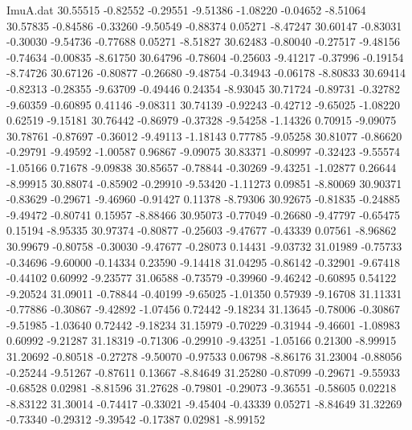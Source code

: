 \begin{filecontents}{ImuA.dat}
  30.55515   -0.82552   -0.29551   -9.51386   -1.08220   -0.04652   -8.51064
  30.57835   -0.84586   -0.33260   -9.50549   -0.88374    0.05271   -8.47247
  30.60147   -0.83031   -0.30030   -9.54736   -0.77688    0.05271   -8.51827
  30.62483   -0.80040   -0.27517   -9.48156   -0.74634   -0.00835   -8.61750
  30.64796   -0.78604   -0.25603   -9.41217   -0.37996   -0.19154   -8.74726
  30.67126   -0.80877   -0.26680   -9.48754   -0.34943   -0.06178   -8.80833
  30.69414   -0.82313   -0.28355   -9.63709   -0.49446    0.24354   -8.93045
  30.71724   -0.89731   -0.32782   -9.60359   -0.60895    0.41146   -9.08311
  30.74139   -0.92243   -0.42712   -9.65025   -1.08220    0.62519   -9.15181
  30.76442   -0.86979   -0.37328   -9.54258   -1.14326    0.70915   -9.09075
  30.78761   -0.87697   -0.36012   -9.49113   -1.18143    0.77785   -9.05258
  30.81077   -0.86620   -0.29791   -9.49592   -1.00587    0.96867   -9.09075
  30.83371   -0.80997   -0.32423   -9.55574   -1.05166    0.71678   -9.09838
  30.85657   -0.78844   -0.30269   -9.43251   -1.02877    0.26644   -8.99915
  30.88074   -0.85902   -0.29910   -9.53420   -1.11273    0.09851   -8.80069
  30.90371   -0.83629   -0.29671   -9.46960   -0.91427    0.11378   -8.79306
  30.92675   -0.81835   -0.24885   -9.49472   -0.80741    0.15957   -8.88466
  30.95073   -0.77049   -0.26680   -9.47797   -0.65475    0.15194   -8.95335
  30.97374   -0.80877   -0.25603   -9.47677   -0.43339    0.07561   -8.96862
  30.99679   -0.80758   -0.30030   -9.47677   -0.28073    0.14431   -9.03732
  31.01989   -0.75733   -0.34696   -9.60000   -0.14334    0.23590   -9.14418
  31.04295   -0.86142   -0.32901   -9.67418   -0.44102    0.60992   -9.23577
  31.06588   -0.73579   -0.39960   -9.46242   -0.60895    0.54122   -9.20524
  31.09011   -0.78844   -0.40199   -9.65025   -1.01350    0.57939   -9.16708
  31.11331   -0.77886   -0.30867   -9.42892   -1.07456    0.72442   -9.18234
  31.13645   -0.78006   -0.30867   -9.51985   -1.03640    0.72442   -9.18234
  31.15979   -0.70229   -0.31944   -9.46601   -1.08983    0.60992   -9.21287
  31.18319   -0.71306   -0.29910   -9.43251   -1.05166    0.21300   -8.99915
  31.20692   -0.80518   -0.27278   -9.50070   -0.97533    0.06798   -8.86176
  31.23004   -0.88056   -0.25244   -9.51267   -0.87611    0.13667   -8.84649
  31.25280   -0.87099   -0.29671   -9.55933   -0.68528    0.02981   -8.81596
  31.27628   -0.79801   -0.29073   -9.36551   -0.58605    0.02218   -8.83122
  31.30014   -0.74417   -0.33021   -9.45404   -0.43339    0.05271   -8.84649
  31.32269   -0.73340   -0.29312   -9.39542   -0.17387    0.02981   -8.99152

\end{filecontents}
